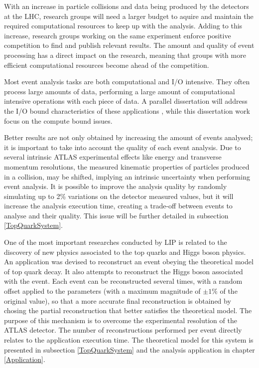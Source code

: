 With an increase in particle collisions and data being produced by the detectors at the LHC, research groups will need a larger budget to aquire and maintain the required computational resources to keep up with the analysis. Adding to this increase, research groups working on the same experiment enforce positive competition to find and publish relevant results. The amount and quality of event processing has a direct impact on the research, meaning that groups with more efficient computational resources become ahead of the competition.

Most event analysis tasks are both computational and I/O intensive. They often process large amounts of data, performing a large amount of computational intensive operations with each piece of data. A parallel dissertation will address the I/O bound characteristics of these applications \cite{thesis:Zuca}, while this dissertation work focus on the compute bound issues.

Better results are not only obtained by increasing the amount of events analysed; it is important to take into account the quality of each event analysis. Due to several intrinsic ATLAS experimental effects like energy and transverse momentum resolutions, the measured kinematic properties of particles produced in a collision, may be shifted, implying an intrinsic uncertainty when performing event analysis. It is possible to improve the analysis quality by randomly simulating up to 2\% variations on the detector measured values, but it will increase the analysis execution time, creating a trade-off between events to analyse and their quality. This issue will be further detailed in subsection \ref{TopQuarkSystem}.

One of the most important researches conducted by LIP is related to the discovery of new physics associated to the top quarks and Higgs boson physics. An application was devised to reconstruct an event obeying the theoretical model of top quark decay. It also attempts to reconstruct the Higgs boson associated with the event. Each event can be reconstructed several times, with a random offset applied to the parameters (with a maximum magnitude of $\pm1\%$ of the original value), so that a more accurate final reconstruction is obtained by chosing the partial reconstruction that better satisfies the theoretical model. The purpose of this mechanism is to overcome the experimental resolution of the ATLAS detector. The number of reconstructions performed per event directly relates to the application execution time. The theoretical model for this system is presented in subsection \ref{TopQuarkSystem} and the analysis application in chapter \ref{Application}.

